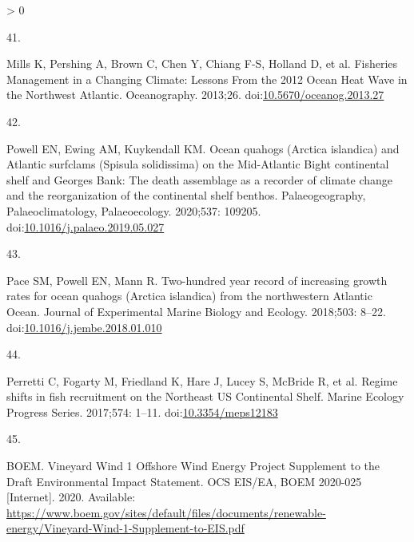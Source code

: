 \documentclass[
  10pt,
]{article}
\newlength{\cslhangindent}
\newlength{\csllabelwidth}
\newenvironment{CSLReferences}[2] %
 {%
  \setlength{\parindent}{0pt}
  \ifodd #1 \everypar{\setlength{\hangindent}{\cslhangindent}}\ignorespaces\fi
  \ifnum #2 > 0
  \setlength{\parskip}{#2\baselineskip}
  \fi
 }%
 {}
\newcommand{\CSLLeftMargin}[1]{\parbox[t]{\csllabelwidth}{#1}}
\newcommand{\CSLRightInline}[1]{\parbox[t]{\linewidth - \csllabelwidth}{#1}\break}
\begin{document}
\begin{CSLReferences}{0}{0}
\leavevmode\hypertarget{ref-mills_fisheries_2013}{}%
\CSLLeftMargin{41. }
\CSLRightInline{Mills K, Pershing A, Brown C, Chen Y, Chiang F-S,
Holland D, et al. Fisheries {Management} in a {Changing} {Climate}:
{Lessons} {From} the 2012 {Ocean} {Heat} {Wave} in the {Northwest}
{Atlantic}. Oceanography. 2013;26.
doi:\href{https://doi.org/10.5670/oceanog.2013.27}{10.5670/oceanog.2013.27}}

\leavevmode\hypertarget{ref-powell_ocean_2020}{}%
\CSLLeftMargin{42. }
\CSLRightInline{Powell EN, Ewing AM, Kuykendall KM. Ocean quahogs
({Arctica} islandica) and {Atlantic} surfclams ({Spisula} solidissima)
on the {Mid}-{Atlantic} {Bight} continental shelf and {Georges} {Bank}:
{The} death assemblage as a recorder of climate change and the
reorganization of the continental shelf benthos. Palaeogeography,
Palaeoclimatology, Palaeoecology. 2020;537: 109205.
doi:\href{https://doi.org/10.1016/j.palaeo.2019.05.027}{10.1016/j.palaeo.2019.05.027}}

\leavevmode\hypertarget{ref-pace_two-hundred_2018}{}%
\CSLLeftMargin{43. }
\CSLRightInline{Pace SM, Powell EN, Mann R. Two-hundred year record of
increasing growth rates for ocean quahogs ({Arctica} islandica) from the
northwestern {Atlantic} {Ocean}. Journal of Experimental Marine Biology
and Ecology. 2018;503: 8--22.
doi:\href{https://doi.org/10.1016/j.jembe.2018.01.010}{10.1016/j.jembe.2018.01.010}}

\leavevmode\hypertarget{ref-perretti_regime_2017}{}%
\CSLLeftMargin{44. }
\CSLRightInline{Perretti C, Fogarty M, Friedland K, Hare J, Lucey S,
McBride R, et al. Regime shifts in fish recruitment on the {Northeast}
{US} {Continental} {Shelf}. Marine Ecology Progress Series. 2017;574:
1--11. doi:\href{https://doi.org/10.3354/meps12183}{10.3354/meps12183}}

\leavevmode\hypertarget{ref-boem_vineyard_2020}{}%
\CSLLeftMargin{45. }
\CSLRightInline{BOEM. Vineyard {Wind} 1 {Offshore} {Wind} {Energy}
{Project} {Supplement} to the {Draft} {Environmental} {Impact}
{Statement}. {OCS} {EIS}/{EA}, {BOEM} 2020-025 {[}Internet{]}. 2020.
Available:
\url{https://www.boem.gov/sites/default/files/documents/renewable-energy/Vineyard-Wind-1-Supplement-to-EIS.pdf}}

\end{CSLReferences}
\end{document}
